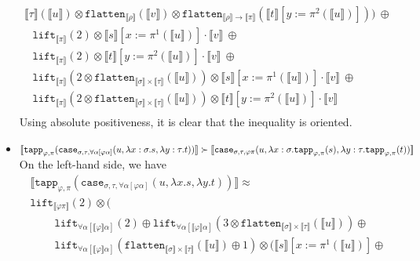 \documentclass[runningheads,a4paper]{llncs}
\newcommand{\quant}[2]{\forall #1[#2]}
\newcommand{\typeinterpret}[1]{\llbracket #1 \rrbracket}
\newcommand{\interpret}[1]{\llbracket #1 \rrbracket}
\newcommand{\arrtype}{\rightarrow}
\newcommand{\abs}[2]{\lambda #1.#2}
\newcommand{\flatten}{\mathtt{flatten}}
\newcommand{\lift}{\mathtt{lift}}
\begin{document}
\begin{itemize}
\[\begin{array}{l}
{    \typeinterpret{\tau}}(\interpret{u}) \otimes
    \flatten_{\typeinterpret{\rho}}(\interpret{v}) \otimes
    \flatten_{\typeinterpret{\rho} \arrtype \typeinterpret{\pi}}(
    \interpret{t}[y:=\pi^2(\interpret{u})]))\ \oplus \\
  \phantom{A}
  \lift_{\typeinterpret{\pi}}(2) \otimes \interpret{s}[x:=\pi^1(
    \interpret{u})] \cdot \interpret{v}\ \oplus \\
  \phantom{A}
  \lift_{\typeinterpret{\pi}}(2) \otimes \interpret{t}[y:=\pi^2(
    \interpret{u})] \cdot \interpret{v}\ \oplus \\
  \phantom{A}
  \lift_{\typeinterpret{\pi}}(2 \otimes
    \flatten_{\typeinterpret{\sigma} \times
    \typeinterpret{\tau}}(\interpret{u})) \otimes
    \interpret{s}[x:=\pi^1(\interpret{u})] \cdot \interpret{v}\ \oplus\\
  \phantom{A}
  \lift_{\typeinterpret{\pi}}(2 \otimes
    \flatten_{\typeinterpret{\sigma} \times
    \typeinterpret{\tau}}(\interpret{u})) \otimes
    \interpret{t}[y:=\pi^2(\interpret{u})] \cdot \interpret{v} \\
  \end{array}
  \]
  Using absolute positiveness, it is clear that the inequality is
  oriented.
\item $\interpret{\mathtt{tapp}_{\varphi,\pi}(\mathtt{case}_{\sigma,\tau,
  \quant{\alpha}{\varphi\alpha}}(u,\abs{x:\sigma}{s},\abs{y:\tau}{t}))}
  \succ \\ \interpret{\mathtt{case}_{\sigma,\tau,\varphi\pi}(u,
  \abs{x:\sigma}{\mathtt{tapp}_{\varphi,\pi}(s)},
  \abs{y:\tau}{\mathtt{tapp}_{\varphi,\pi}(t)})}$ \\
  On the left-hand side, we have
  \[
  \begin{array}{l}
  \interpret{\mathtt{tapp}_{\varphi,\pi}(\mathtt{case}_{\sigma,\tau,
  \quant{\alpha}{\varphi\alpha}}(u,\abs{x}{s},\abs{y}{t}))} \approx \\
  \lift_{\typeinterpret{\varphi\pi}}(2) \otimes ( \\
    \phantom{ABC}
    \lift_{\quant{\alpha}{\typeinterpret{\varphi}\alpha}}(2) \oplus
    \lift_{\quant{\alpha}{\typeinterpret{\varphi}\alpha}}(3 \otimes
      \flatten_{\typeinterpret{\sigma} \times \typeinterpret{\tau}}(
      \interpret{u})) \oplus \\
    \phantom{ABC}
    \lift_{\quant{\alpha}{\typeinterpret{\varphi}\alpha}}(
      \flatten_{\typeinterpret{\sigma} \times \typeinterpret{\tau}}(
      \interpret{u}) \oplus 1) \otimes (
      \interpret{s}[x:=\pi^1(\interpret{u})] \oplus

\end{array}\]
\end{itemize}
\end{document}
